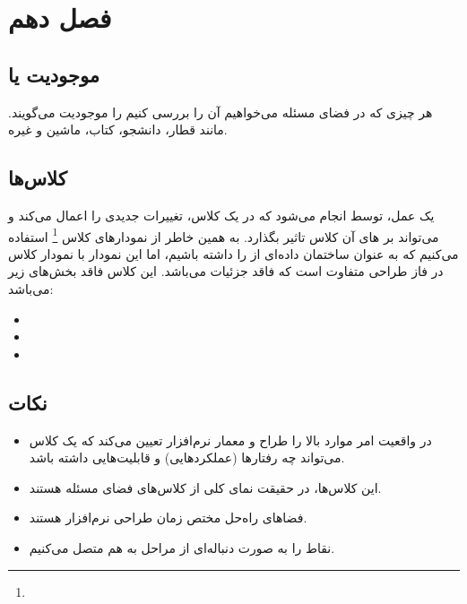 \newpage

\section{فصل دهم}

\subsection{موجودیت یا }

هر چیزی که در فضای مسئله می‌خواهیم آن را بررسی کنیم را موجودیت می‌گویند. مانند
قطار، دانشجو، کتاب، ماشین و غیره.

\subsection{کلاس‌ها }

یک عمل، توسط  انجام می‌شود که در یک کلاس، تغییرات جدیدی را اعمال
می‌کند و می‌تواند بر های آن کلاس تاثیر بگذارد. به همین خاطر از
نمودار‌های کلاس \footnote{} استفاده می‌کنیم که به عنوان
ساختمان داده‌ای از  را داشته باشیم، اما این نمودار با نمودار کلاس در
فاز طراحی متفاوت است که فاقد جزئیات می‌باشد. این کلاس فاقد بخش‌های زیر می‌باشد:

\begin{LTR}
    \begin{itemize}
        \item {}
        \item {}
        \item {}
    \end{itemize}
\end{LTR}

\subsection*{نکات}

\begin{itemize} 
    \item در واقعیت امر موارد بالا را طراح و معمار نرم‌افزار تعیین می‌کند که یک
    کلاس می‌تواند چه رفتار‌ها (عملکرد‌هایی) و قابلیت‌هایی داشته باشد.
    \item این کلاس‌ها، در حقیقت نمای کلی از کلاس‌های فضای مسئله هستند.
    \item فضا‌های راه‌حل مختص زمان طراحی نرم‌افزار هستند.
    \item نقاط را به صورت دنباله‌ای از مراحل به هم متصل می‌کنیم.
\end{itemize}

